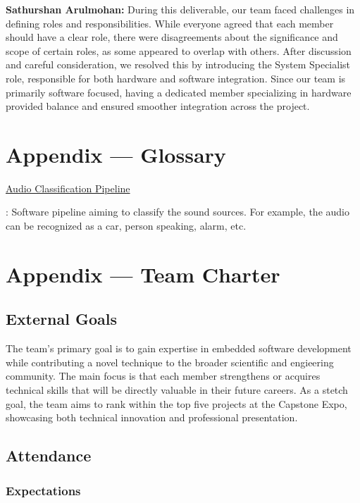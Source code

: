 \documentclass{article}
\begin{document}
\begin{enumerate}
    \textbf{Sathurshan Arulmohan:} During this deliverable, our team faced challenges in defining roles and responsibilities.
    While everyone agreed that each member should have a clear role, there were disagreements about the significance and scope of certain roles, as some appeared to overlap with others.
    After discussion and careful consideration, we resolved this by introducing the System Specialist role, responsible for both hardware and software integration.
    Since our team is primarily software focused, having a dedicated member specializing in hardware provided balance and ensured smoother integration across the project.

\end{enumerate}

\newpage{}

\section*{Appendix --- Glossary}


\hypertarget{audio_classification_pipeline}{\underline{Audio Classification Pipeline}}: 
Software pipeline aiming to classify the sound sources.
For example, the audio can be recognized as a car, person speaking, alarm, etc.

\newpage{}

\section*{Appendix --- Team Charter}

\subsection*{External Goals}

The team's primary goal is to gain expertise in embedded software development while contributing a novel technique to the broader scientific and engieering community.
The main focus is that each member strengthens or acquires technical skills that will be directly valuable in their future careers.
As a stetch goal, the team aims to rank within the top five projects at the Capstone Expo, showcasing both technical innovation and professional presentation.

\subsection*{Attendance}

\subsubsection*{Expectations}
\end{document}
